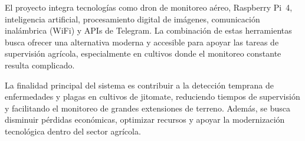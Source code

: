 El proyecto integra tecnologías como dron de monitoreo aéreo, Raspberry Pi~4, inteligencia artificial, procesamiento digital de imágenes, comunicación inalámbrica (WiFi) y APIs de Telegram. La combinación de estas herramientas busca ofrecer una alternativa moderna y accesible para apoyar las tareas de supervisión agrícola, especialmente en cultivos donde el monitoreo constante resulta complicado.

La finalidad principal del sistema es contribuir a la detección temprana de enfermedades y plagas en cultivos de jitomate, reduciendo tiempos de supervisión y facilitando el monitoreo de grandes extensiones de terreno. Además, se busca disminuir pérdidas económicas, optimizar recursos y apoyar la modernización tecnológica dentro del sector agrícola.

\thispagestyle{empty}
